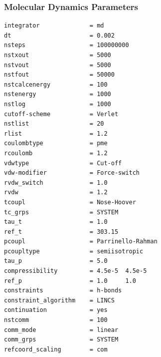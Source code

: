 \documentclass[
  twocolumn]{biophys-new-mod}
\begin{document}
\hypertarget{sec-prod-mdp}{%
\subsubsection{Molecular Dynamics Parameters}\label{sec-prod-mdp}}

\begin{verbatim}
integrator              = md
dt                      = 0.002
nsteps                  = 100000000
nstxout                 = 5000
nstvout                 = 5000
nstfout                 = 50000
nstcalcenergy           = 100
nstenergy               = 1000
nstlog                  = 1000
cutoff-scheme           = Verlet
nstlist                 = 20
rlist                   = 1.2
coulombtype             = pme
rcoulomb                = 1.2
vdwtype                 = Cut-off
vdw-modifier            = Force-switch
rvdw_switch             = 1.0
rvdw                    = 1.2
tcoupl                  = Nose-Hoover
tc_grps                 = SYSTEM
tau_t                   = 1.0
ref_t                   = 303.15
pcoupl                  = Parrinello-Rahman
pcoupltype              = semiisotropic
tau_p                   = 5.0
compressibility         = 4.5e-5  4.5e-5
ref_p                   = 1.0     1.0
constraints             = h-bonds
constraint_algorithm    = LINCS
continuation            = yes
nstcomm                 = 100
comm_mode               = linear
comm_grps               = SYSTEM
refcoord_scaling        = com
\end{verbatim}
\end{document}
